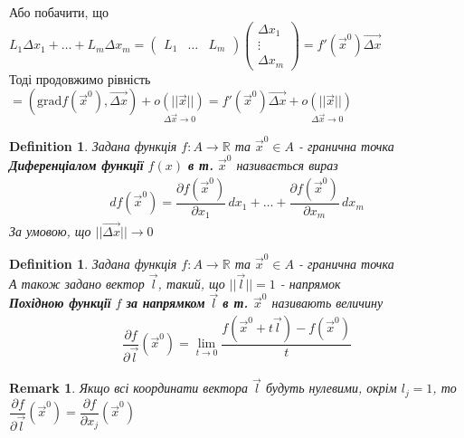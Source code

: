 \documentclass[a4paper, 14pt]{extarticle}
\def\bigline{\vspace{5mm}\\}
\theoremstyle{theoremdd}
\theoremstyle{theoremdd}
\newtheorem{definition}[theorem]{Definition}
\theoremstyle{theoremdd}
\theoremstyle{theoremdd}
\newtheorem{remark}[theorem]{Remark}
\theoremstyle{theoremdd}
\theoremstyle{theoremdd}
\theoremstyle{theoremdd}
\begin{document}
Або побачити, що $L_1 \Delta x_1 + \dots + L_m \Delta x_m = \begin{pmatrix}
L_1 & \dots & L_m
\end{pmatrix} \begin{pmatrix}
\Delta x_1 \\ \vdots \\ \Delta x_m
\end{pmatrix} = f'(\vec{x}^0) \overrightarrow{\Delta x}$\\
Тоді продовжимо рівність\\
$\boxed{=} \left(\textrm{grad} f(\vec{x}^0), \overrightarrow{\Delta x}\right) + \underset{\Delta \vec{x} \to 0}{o(||\vec{x}||)} = f'(\vec{x}^0) \overrightarrow{\Delta x} + \underset{\Delta \vec{x} \to 0}{o(||\vec{x}||)}$
\bigline

\begin{definition}
Задана функція $f: A \to \mathbb{R}$ та $\vec{x}^0 \in A$ - гранична точка\\
\textbf{Диференціалом функції} $f(x)$ \textbf{в т.} $\vec{x}^0$ називається вираз
\begin{align*}
df(\vec{x}^0) = \dfrac{\partial f(\vec{x}^0)}{\partial x_1}\,dx_1 + \dots + \dfrac{\partial f(\vec{x}^0)}{\partial x_m}\,dx_m
\end{align*}
За умовою, що $||\overrightarrow{\Delta x}|| \to 0$
\end{definition}

\begin{definition}
Задана функція $f: A \to \mathbb{R}$ та $\vec{x}^0 \in A$ - гранична точка\\
А також задано вектор $\vec{l}$, такий, що $||\vec{l}|| = 1$ - напрямок\\
\textbf{Похідною функції} $f$ \textbf{за напрямком} $\vec{l}$ \textbf{в т. $\vec{x}^0$} називають величину
\begin{align*}
\dfrac{\partial f}{\partial \vec{l}} (\vec{x}^0) = \lim_{t \to 0} \dfrac{f(\vec{x}^0+t \vec{l}) - f(\vec{x}^0)}{t}
\end{align*}
\end{definition}

\begin{remark}
Якщо всі координати вектора $\vec{l}$ будуть нулевими, окрім $l_j = 1$, то $\dfrac{\partial f}{\partial \vec{l}} (\vec{x}^0) = \dfrac{\partial f}{\partial x_j} (\vec{x}^0)$
\end{remark}
\end{document}
